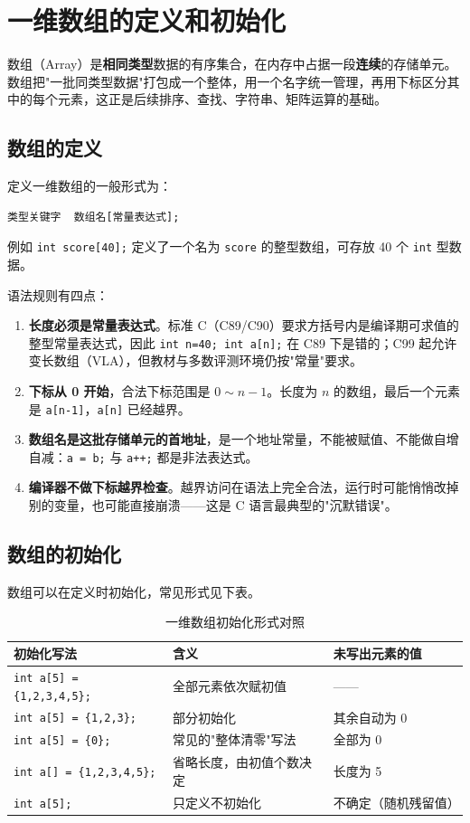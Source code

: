 
\section{一维数组的定义和初始化}
数组（Array）是\textbf{相同类型}数据的有序集合，在内存中占据一段\textbf{连续}的存储单元。数组把"一批同类型数据"打包成一个整体，用一个名字统一管理，再用下标区分其中的每个元素，这正是后续排序、查找、字符串、矩阵运算的基础。

\subsection{数组的定义}
定义一维数组的一般形式为：
\begin{verbatim}
类型关键字  数组名[常量表达式];
\end{verbatim}
例如 \texttt{int score[40];} 定义了一个名为 \texttt{score} 的整型数组，可存放 40 个 \texttt{int} 型数据。

语法规则有四点：
\begin{enumerate}
  \item \textbf{长度必须是常量表达式}。标准 C（C89/C90）要求方括号内是编译期可求值的整型常量表达式，因此 \texttt{int n=40; int a[n];} 在 C89 下是错的；C99 起允许变长数组（VLA），但教材与多数评测环境仍按"常量"要求。
  \item \textbf{下标从 0 开始}，合法下标范围是 $0\sim n-1$。长度为 $n$ 的数组，最后一个元素是 \texttt{a[n-1]}，\texttt{a[n]} 已经越界。
  \item \textbf{数组名是这批存储单元的首地址}，是一个地址常量，不能被赋值、不能做自增自减：\texttt{a = b;} 与 \texttt{a++;} 都是非法表达式。
  \item \textbf{编译器不做下标越界检查}。越界访问在语法上完全合法，运行时可能悄悄改掉别的变量，也可能直接崩溃——这是 C 语言最典型的"沉默错误"。
\end{enumerate}

\subsection{数组的初始化}
数组可以在定义时初始化，常见形式见下表。

\begin{table}[htbp]
\centering
\caption{一维数组初始化形式对照}
\footnotesize
\begin{tabularx}{\textwidth}{@{}p{4.6cm}Xp{2.6cm}@{}}
\toprule
初始化写法 & 含义 & 未写出元素的值 \\
\midrule
\texttt{int a[5] = \{1,2,3,4,5\};} & 全部元素依次赋初值 & —— \\
\texttt{int a[5] = \{1,2,3\};} & 部分初始化 & 其余自动为 0 \\
\texttt{int a[5] = \{0\};} & 常见的"整体清零"写法 & 全部为 0 \\
\texttt{int a[] = \{1,2,3,4,5\};} & 省略长度，由初值个数决定 & 长度为 5 \\
\texttt{int a[5];} & 只定义不初始化 & 不确定（随机残留值） \\
\bottomrule
\end{tabularx}
\end{table}

